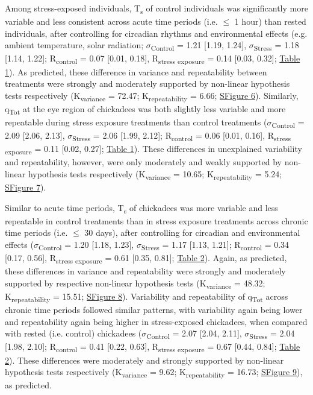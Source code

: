 \documentclass[12pt]{article}
\begin{document}
\noindent Among stress-exposed individuals, T\textsubscript{s} of control individuals was significantly more variable and less consistent across acute time periods (i.e. $\leq$ 1 hour) than rested individuals, after controlling for circadian rhythms and environmental effects (e.g. ambient temperature, solar radiation; $\sigma$\textsubscript{Control} = 1.21 [1.19, 1.24], $\sigma$\textsubscript{Stress} = 1.18 [1.14, 1.22]; R\textsubscript{control} = 0.07 [0.01, 0.18], R\textsubscript{stress exposure} = 0.14 [0.03, 0.32]; \hyperref[Tab4.1]{Table 1}). As predicted, these difference in variance and repeatability between treatments were strongly and moderately supported by non-linear hypothesis tests respectively (K\textsubscript{variance} = 72.47; K\textsubscript{repeatability} = 6.66; \hyperref[FigC.6]{SFigure 6}). Similarly, q\textsubscript{Tot} at the eye region of chickadees was both slightly less variable and more repeatable during stress exposure treatments than control treatments ($\sigma$\textsubscript{Control} = 2.09 [2.06, 2.13], $\sigma$\textsubscript{Stress} = 2.06 [1.99, 2.12]; R\textsubscript{control} = 0.06 [0.01, 0.16], R\textsubscript{stress exposure} = 0.11 [0.02, 0.27]; \hyperref[Tab4.1]{Table 1}). These differences in unexplained variability and repeatability, however, were only moderately and weakly supported by non-linear hypothesis tests respectively (K\textsubscript{variance} = 10.65; K\textsubscript{repeatability} = 5.24; \hyperref[FigC.7]{SFigure 7}). \vspace{1cm}
  
\noindent Similar to acute time periods, T\textsubscript{s} of chickadees was more variable and less repeatable in control treatments than in stress exposure treatments across chronic time periods (i.e. $\leq$ 30 days), after controlling for circadian and environmental effects ($\sigma$\textsubscript{Control} = 1.20 [1.18, 1.23], $\sigma$\textsubscript{Stress} = 1.17 [1.13, 1.21]; R\textsubscript{control} = 0.34 [0.17, 0.56], R\textsubscript{stress exposure} = 0.61 [0.35, 0.81]; \hyperref[Tab4.2]{Table 2}). Again, as predicted, these differences in variance and repeatability were strongly and moderately supported by respective non-linear hypothesis tests (K\textsubscript{variance} = 48.32; K\textsubscript{repeatability} = 15.51; \hyperref[FigC.8]{SFigure 8}). Variability and repeatability of q\textsubscript{Tot} across chronic time periods followed similar patterns, with variability again being lower and repeatability again being higher in stress-exposed chickadees, when compared with rested (i.e. control) chickadees ($\sigma$\textsubscript{Control} = 2.07 [2.04, 2.11], $\sigma$\textsubscript{Stress} = 2.04 [1.98, 2.10]; R\textsubscript{control} = 0.41 [0.22, 0.63], R\textsubscript{stress exposure} = 0.67 [0.44, 0.84]; \hyperref[Tab4.2]{Table 2}). These differences were moderately and strongly supported by non-linear hypothesis tests respectively (K\textsubscript{variance} = 9.62; K\textsubscript{repeatability} = 16.73; \hyperref[FigC.9]{SFigure 9}), as predicted.\vspace{0.5cm}
\end{document}
